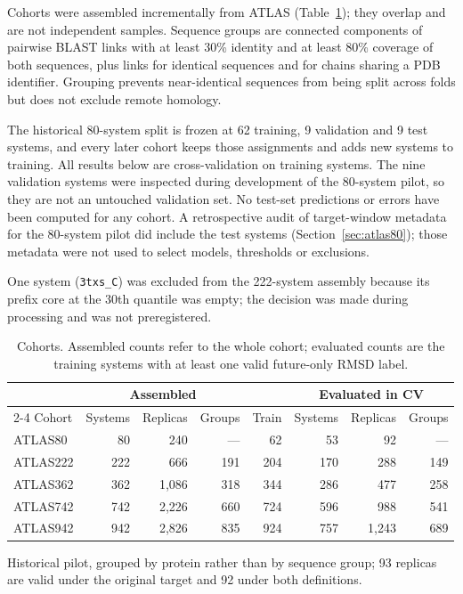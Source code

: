 \documentclass[11pt]{article}
\begin{document}
Cohorts were assembled incrementally from ATLAS (Table~\ref{tab:cohorts}); they overlap and are not independent samples. Sequence groups are connected components of pairwise BLAST links with at least 30\% identity and at least 80\% coverage of both sequences, plus links for identical sequences and for chains sharing a PDB identifier. Grouping prevents near-identical sequences from being split across folds but does not exclude remote homology.

The historical 80-system split is frozen at 62 training, 9 validation and 9 test systems, and every later cohort keeps those assignments and adds new systems to training. All results below are cross-validation on training systems. The nine validation systems were inspected during development of the 80-system pilot, so they are not an untouched validation set. No test-set predictions or errors have been computed for any cohort. A retrospective audit of target-window metadata for the 80-system pilot did include the test systems (Section~\ref{sec:atlas80}); those metadata were not used to select models, thresholds or exclusions.

One system (\texttt{3txs\_C}) was excluded from the 222-system assembly because its prefix core at the 30th quantile was empty; the decision was made during processing and was not preregistered.

\begin{table}[ht]
\centering
\small
\begin{threeparttable}
\caption{Cohorts. Assembled counts refer to the whole cohort; evaluated counts are the training systems with at least one valid future-only RMSD label.}
\label{tab:cohorts}
\begin{tabular}{lrrrrrrr}
\toprule
 & \multicolumn{3}{c}{Assembled} & & \multicolumn{3}{c}{Evaluated in CV} \\
\cmidrule{2-4}\cmidrule{6-8}
Cohort & Systems & Replicas & Groups & Train & Systems & Replicas & Groups \\
\midrule
ATLAS80\tnote{a}  & 80  & 240   & --- & 62  & 53  & 92    & ---\\
ATLAS222 & 222 & 666   & 191 & 204 & 170 & 288   & 149 \\
ATLAS362 & 362 & 1,086 & 318 & 344 & 286 & 477   & 258 \\
ATLAS742 & 742 & 2,226 & 660 & 724 & 596 & 988   & 541 \\
ATLAS942 & 942 & 2,826 & 835 & 924 & 757 & 1,243 & 689 \\
\bottomrule
\end{tabular}
\begin{tablenotes}[flushleft]
\footnotesize
\item[a] Historical pilot, grouped by protein rather than by sequence group; 93 replicas are valid under the original target and 92 under both definitions.
\end{tablenotes}
\end{threeparttable}
\end{table}
\end{document}
